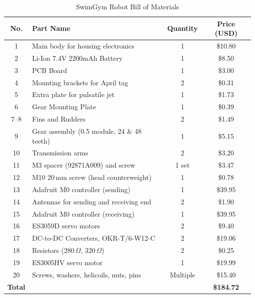 \begin{table}[H]
\centering
\caption{SwimGym Robot Bill of Materials}
\label{tab:parts_list}
\begin{tabular}{c l c c}
\hline
\textbf{No.} & \textbf{Part Name} & \textbf{Quantity} & \textbf{Price (USD)} \\ \hline
1  & Main body for housing electronics         & 1        & \$10.80 \\
2  & Li-Ion 7.4V 2200mAh Battery               & 1        & \$8.50 \\
3  & PCB Board                                 & 1        & \$3.00 \\
4  & Mounting brackets for April tag           & 2        & \$0.31 \\
5  & Extra plate for pulsatile jet             & 1        & \$1.73 \\
6  & Gear Mounting Plate                       & 1        & \$0.39 \\
7--8 & Fins and Rudders                          & 2        & \$1.49 \\
9  & Gear assembly (0.5 module, 24 \& 48 teeth) & 1       & \$5.15 \\
10 & Transmission arms                         & 2        & \$3.20 \\
11 & M3 spacer (92871A009) and screw           & 1 set    & \$3.47 \\
12 & M10 20\,mm screw (head counterweight)     & 1        & \$0.78 \\
13 & Adafruit M0 controller (sending)          & 1        & \$39.95 \\
14 & Antennae for sending and receiving end     & 2        & \$1.90 \\
15 & Adafruit M0 controller (receiving)        & 1        & \$39.95 \\
16 & ES3059D servo motors                      & 2        & \$9.40 \\
17 & DC-to-DC Converters, OKR-T/6-W12-C         & 2        & \$19.06 \\
18 & Resistors (280\,$\Omega$, 320\,$\Omega$)   & 2        & \$0.25 \\
19 & ES3005HV servo motor                      & 1        & \$19.99 \\
20 & Screws, washers, helicoils, nuts, pins& Multiple & \$15.40 \\ 
\textbf{Total} & & &{\textbf{\$184.72}} \\
\hline
\end{tabular}
\end{table}
 
